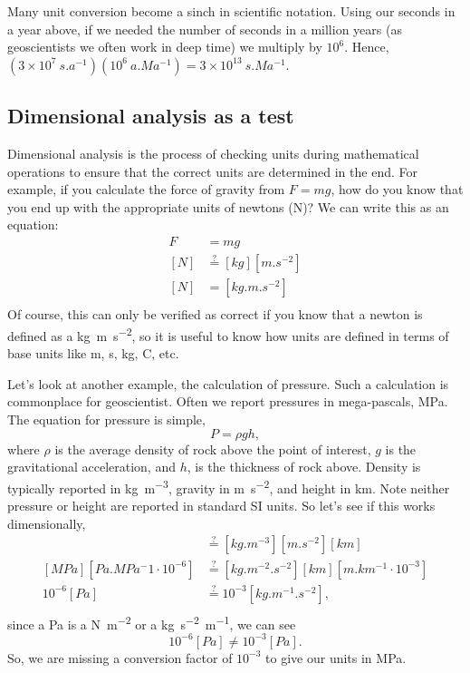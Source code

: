 \begin{activity}
Many unit conversion become a sinch in scientific notation.  Using our seconds in a year above, if we needed the number of seconds in a million years (as geoscientists we often work in deep time) we multiply by $10^6$.  Hence, $(3 \times 10^{7}~\si{s.a^{-1}}) (10^6~\si{a.Ma^{-1}}) = 3 \times 10^{13}~\si{s.Ma^{-1}}$.

\subsection{Dimensional analysis as a test}
Dimensional analysis is the process of checking units during mathematical operations to ensure that the correct units are determined in the end.  For example, if you calculate the force of gravity from $F = mg$, how do you know that you end up with the appropriate units of newtons (N)?  We can write this as an equation:
\begin{align*}
    F &= m g \\
    [\si{N}] &\overset{?}{=} [\si{kg}] [\si{m.s^{-2}}] \\
    [\si{N}] &= [\si{kg.m.s^{-2}}] \\
\end{align*}
Of course, this can only be verified as correct if you know that a newton is defined as a \si{kg.m.s^{-2}}, so it is useful to know how units are defined in terms of base units like \si{m}, \si{s}, \si{kg}, \si{C}, etc.

Let's look at another example, the calculation of pressure.  Such a calculation is commonplace for geoscientist.  Often we report pressures in mega-pascals, \si{MPa}.  The equation for pressure is simple,
\[
    P = \rho g h\! ,
\]
where $\rho$ is the average density of rock above the point of interest, $g$ is the gravitational acceleration, and $h$, is the thickness of rock above. Density is typically reported in \si{kg.m^{-3}}, gravity in \si{m.s^{-2}}, and height in \si{km}.  Note neither pressure or height are reported in standard SI units.  So let's see if this works dimensionally,
\begin{align*}
    [\si{MPa}] &\overset{?}{=} [\si{kg.m^{-3}}][\si{m.s^{-2}}][\si{km}] \\
    [\si{MPa}][\si{Pa.MPa^-1} \cdot 10^{-6}] &\overset{?}{=} [\si{kg.m^{-2}.s^{-2}}][\si{km}][\si{m.km^{-1}} \cdot 10^{-3}] \\
    10^{-6} [\si{Pa}] &\overset{?}{=} 10^{-3} [\si{kg.m^{-1}.s^{-2}}] , \\
\end{align*}
since a \si{Pa} is a \si{N.m^{-2}} or a \si{kg.s^{-2}.m^{-1}}, we can see
\[
    10^{-6}[\si{Pa}] \neq 10^{-3} [\si{Pa}]\! .
\]
So, we are missing a conversion factor of $10^{-3}$ to give our units in \si{MPa}.


\end{activity}
